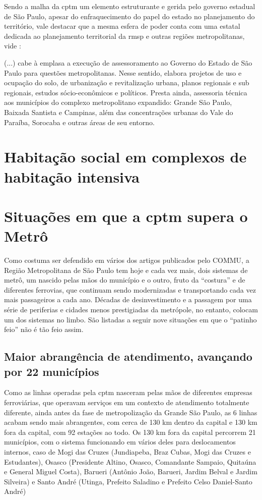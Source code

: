 \documentclass[11pt,fleqn]{book} %
\begin{document}
Sendo a malha da \gls{cptm} um elemento estruturante e gerida pelo governo estadual de São Paulo, apesar do enfraquecimento do papel do estado no planejamento do território, vale destacar que a mesma esfera de poder conta com uma estatal dedicada ao planejamento territorial da \gls{rmsp} e outras regiões metropolitanas, vide \cite[p. 224]{Stefani}: 

\begin{citacao}
	(...) cabe à \gls{emplasa} a execução de assessoramento ao Governo do Estado de São Paulo para questões metropolitanas. Nesse sentido, elabora projetos de uso e ocupação do solo, de urbanização e revitalização urbana, planos regionais e sub regionais, estudos sócio-econômicos e políticos. Presta ainda, assessoria técnica aos municípios do complexo metropolitano expandido: Grande São Paulo, Baixada Santista e Campinas, além das concentrações urbanas do Vale do Paraíba, Sorocaba e outras áreas de seu entorno.
\end{citacao}

\section{Habitação social em complexos de habitação intensiva}

\lipsum[3-4]

\section{Situações em que a \gls{cptm} supera o Metrô}

Como costuma ser defendido em vários dos artigos publicados pelo COMMU, a Região Metropolitana de São Paulo tem hoje e cada vez mais, dois sistemas de metrô, um nascido pelas mãos do município e o outro, fruto da ``costura'' e de diferentes ferrovias, que continuam sendo modernizadas e transportando cada vez mais passageiros a cada ano. Décadas de desinvestimento e a passagem por uma série de periferias e cidades menos prestigiadas da metrópole, no entanto, colocam um dos sistemas no limbo. São listadas a seguir nove situações em que o ``patinho feio'' não é tão feio assim.

\subsection{Maior abrangência de atendimento, avançando por 22 municípios}

Como as linhas operadas pela \gls{cptm} nasceram pelas mãos de diferentes empresas ferroviárias, que operavam serviços em um contexto de atendimento totalmente diferente, ainda antes da fase de metropolização da Grande São Paulo, as 6 linhas acabam sendo mais abrangentes, com cerca de 130 km dentro da capital e 130 km fora da capital, com 92 estações ao todo. Os 130 km fora da capital percorrem 21 municípios, com o sistema funcionando em vários deles para deslocamentos internos, caso de Mogi das Cruzes (Jundiapeba, Braz Cubas, Mogi das Cruzes e Estudantes), Osasco (Presidente Altino, Osasco, Comandante Sampaio, Quitaúna e General Miguel Costa), Barueri (Antônio João, Barueri, Jardim Belval e Jardim Silveira) e Santo André (Utinga, Prefeito Saladino e Prefeito Celso Daniel-Santo André)
\end{document}
